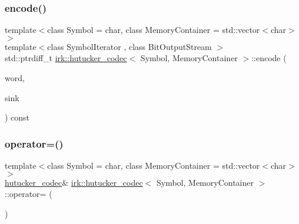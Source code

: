 \mbox{\label{classirk_1_1hutucker__codec_a4a2870c7684fab90126b45d7b5caaba9}} 
\subsubsection{\texorpdfstring{encode()}{encode()}\hspace{0.1cm}{\footnotesize\ttfamily [5/5]}}
{\footnotesize\ttfamily template$<$class Symbol = char, class Memory\+Container = std\+::vector$<$char$>$$>$ \\
template$<$class Symbol\+Iterator , class Bit\+Output\+Stream $>$ \\
std\+::ptrdiff\+\_\+t \mbox{\hyperlink{classirk_1_1hutucker__codec}{irk\+::hutucker\+\_\+codec}}$<$ Symbol, Memory\+Container $>$\+::encode (\begin{DoxyParamCaption}\item[{const std\+::string \&}]{word,  }\item[{Bit\+Output\+Stream \&}]{sink }\end{DoxyParamCaption}) const\hspace{0.3cm}{\ttfamily [inline]}}

\mbox{\label{classirk_1_1hutucker__codec_accb71e2dbf391b20a82d6d7d03f12e7b}} 
\subsubsection{\texorpdfstring{operator=()}{operator=()}\hspace{0.1cm}{\footnotesize\ttfamily [1/2]}}
{\footnotesize\ttfamily template$<$class Symbol = char, class Memory\+Container = std\+::vector$<$char$>$$>$ \\
\mbox{\hyperlink{classirk_1_1hutucker__codec}{hutucker\+\_\+codec}}\& \mbox{\hyperlink{classirk_1_1hutucker__codec}{irk\+::hutucker\+\_\+codec}}$<$ Symbol, Memory\+Container $>$\+::operator= (\begin{DoxyParamCaption}\item[{const \mbox{\hyperlink{classirk_1_1hutucker__codec}{hutucker\+\_\+codec}}$<$ Symbol, Memory\+Container $>$ \&}]{ }\end{DoxyParamCaption})\hspace{0.3cm}{\ttfamily [delete]}}

